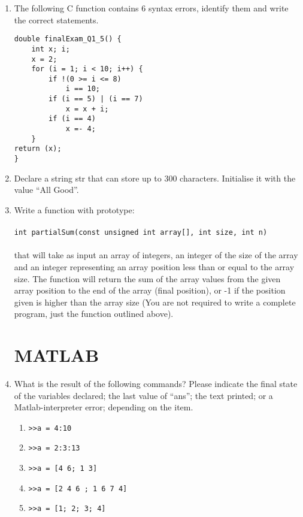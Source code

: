 \documentclass{lab}
\begin{document}
\begin{enumerate}
\begin{lstlisting}[style=CStyle]
	while (counter > arr[2]) {
		counter -= 1;
		number += arr[counter];
	}
	printf("number = %d \n", number);
	return (0);
}
\end{lstlisting}

\item The following C function contains 6 syntax errors, identify them and write the
correct statements.

\begin{lstlisting}[style=CStyle]
double finalExam_Q1_5() {
	int x; i;
	x = 2;
	for (i = 1; i < 10; i++) {
		if !(0 >= i <= 8)
			i == 10;
		if (i == 5) | (i == 7)
			x = x + i;
		if (i == 4)
			x =- 4;
	}
return (x);
}
\end{lstlisting}

\item Declare a string str that can store up to 300 characters. Initialise it with the value ``All Good''.

\item Write a function with prototype:\\
~\\
\texttt{int partialSum(const unsigned int array[], int size, int n)} \\~\\
that will take as input an array of integers, an integer of the size of the array and an integer representing an array position less than or equal to the array size. The function will return the sum of the array values from the given array position to the end of the array (final position), or -1 if the position given is higher than the array size (You are not required to write a complete program, just the function outlined above).

\pagebreak
\section{MATLAB}

\item What is the result of the following commands? Please indicate the final state of the variables declared; the last value of “ans”; the text printed; or a Matlab-interpreter error; depending on the item.

	\begin{enumerate}
\item \texttt{>>a = 4:10}
\item \texttt{>>a = 2:3:13}
\item \texttt{>>a = [4 6; 1 3]}
\item \texttt{>>a = [2 4 6 ; 1 6 7 4]}
\item \texttt{>>a = [1; 2; 3; 4]}


\end{enumerate}
\end{enumerate}
\end{document}
